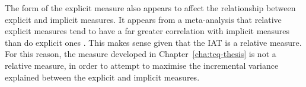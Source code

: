 The form of the explicit measure also appears to affect the relationship between explicit and implicit measures. It appears from a meta-analysis that relative explicit measures tend to have a far greater correlation with implicit measures than do explicit ones \cite{Hofmann2005}. This makes sense given that the IAT is a relative measure. For this reason, the measure developed in Chapter~\ref{cha:tcq-thesis} is not a relative measure, in order to attempt to maximise the incremental variance explained between the explicit and implicit measures. 








